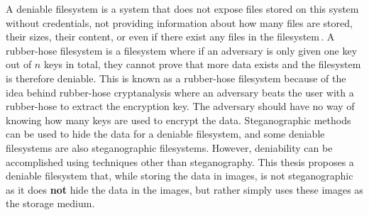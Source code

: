 A deniable filesystem is a system that does not expose files stored on this system without credentials, \ie not providing information about how many files are stored, their sizes, their content, or even if there exist any files in the filesystem\,\cite{andersonSteganographicFileSystem1998}. A \mbox{rubber-hose} filesystem is a filesystem where if an adversary is only given one key out of $n$ keys in total, they cannot prove that more data exists and the filesystem is therefore deniable. This is known as a \mbox{rubber-hose} filesystem because of the idea behind \mbox{rubber-hose} cryptanalysis where an adversary beats the user with a \mbox{rubber-hose} to extract the encryption key. The adversary should have no way of knowing how many keys are used to encrypt the data. Steganographic methods can be used to hide the data for a deniable filesystem, and some deniable filesystems are also steganographic filesystems. However, deniability can be accomplished using techniques other than steganography. This thesis proposes a deniable filesystem that, while storing the data in images, is not steganographic as it does \textbf{not} hide the data in the images, but rather simply uses these images as the storage medium.